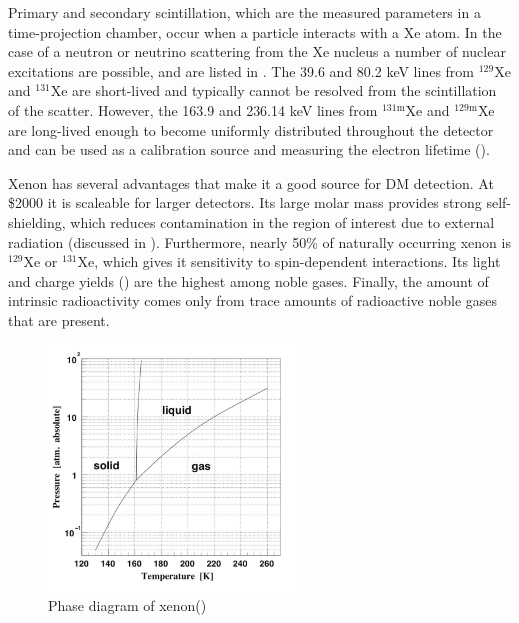 Primary and secondary scintillation, which are the measured parameters in a time-projection chamber, occur when a particle interacts
with a Xe atom.  In the case of a neutron or neutrino scattering from the Xe nucleus a number of nuclear excitations are possible,
and are listed in .  The 39.6 and 80.2 keV lines from $^{129}$Xe and $^{131}$Xe are short-lived and typically
cannot be resolved from the scintillation of the scatter.  However, the 163.9 and 236.14 keV lines from $^{131\mathrm{m}}$Xe and
$^{129\mathrm{m}}$Xe are long-lived
enough to become uniformly distributed throughout the detector and can be used as a calibration source and measuring the electron
lifetime ().

Xenon has several advantages that make it a good source for DM detection.  At \$2000 it is scaleable for larger detectors.  Its
large molar mass provides strong self-shielding, which reduces contamination in the region of interest due to external radiation
(discussed in \secref{}).  Furthermore, nearly 50\% of naturally occurring xenon is $^{129}$Xe or $^{131}$Xe, which gives it sensitivity to
spin-dependent interactions.  Its light and charge yields (\secref{}) are the highest among noble gases.  Finally, the amount of
intrinsic radioactivity comes only from trace amounts of radioactive noble gases that are present.

\begin{figure}
\includegraphics[width=0.6\textwidth]{PhaseDiagram}
\caption{Phase diagram of xenon()}
\label{fig:phase_diagram}
\end{figure}
 
